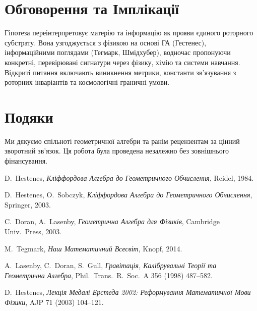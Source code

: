 \documentclass[11pt,a4paper]{article}
\theoremstyle{definition}
\theoremstyle{plain}
\theoremstyle{remark}
\begin{document}
\vspace{1em}

\section{Обговорення та Імплікації}
Гіпотеза переінтерпретовує матерію та інформацію як прояви єдиного роторного субстрату. Вона узгоджується з фізикою на основі ГА (Гестенес), інформаційними поглядами (Тегмарк, Шмідхубер), водночас пропонуючи конкретні, перевірювані сигнатури через фізику, хімію та системи навчання. Відкриті питання включають виникнення метрики, константи зв'язування з роторних інваріантів та космологічні граничні умови.

\vspace{1em}

\section*{Подяки}
Ми дякуємо спільноті геометричної алгебри та ранім рецензентам за цінний зворотний зв'язок. Ця робота була проведена незалежно без зовнішнього фінансування.

\vspace{1em}

\begin{thebibliography}{99}\setlength{\itemsep}{2pt}
D.~Hestenes, \emph{Кліффордова Алгебра до Геометричного Обчислення}, Reidel, 1984.

D.~Hestenes, O.~Sobczyk, \emph{Кліффордова Алгебра до Геометричного Обчислення}, Springer, 2003.

C.~Doran, A.~Lasenby, \emph{Геометрична Алгебра для Фізиків}, Cambridge Univ.\ Press, 2003.

M.~Tegmark, \emph{Наш Математичний Всесвіт}, Knopf, 2014.

A.~Lasenby, C.~Doran, S.~Gull, \emph{Гравітація, Калібрувальні Теорії та Геометрична Алгебра}, Phil.\ Trans.\ R.\ Soc.\ A 356 (1998) 487--582.

D.~Hestenes, \emph{Лекція Медалі Ерстеда 2002: Реформування Математичної Мови Фізики}, AJP 71 (2003) 104--121.

\end{thebibliography}

\end{document}
